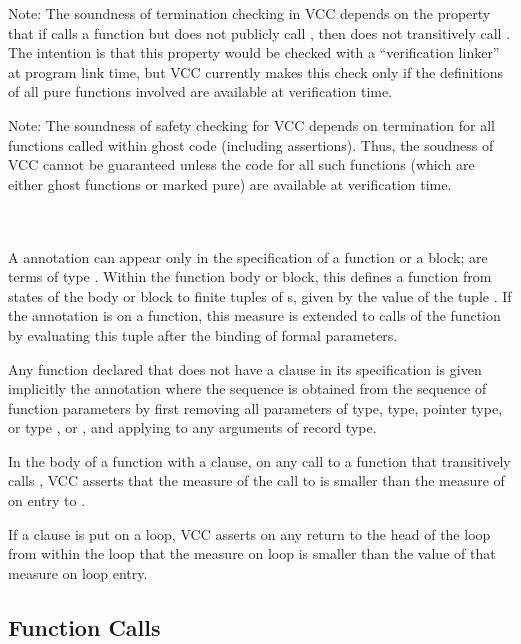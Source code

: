 \documentclass[preprint,nocopyrightspace]{sigplanconf}
\begin{document}
{{{Note: The soundness of termination checking in VCC depends on the
property that if  calls a function  but does not
publicly call , then  does not transitively
call . The intention is that this property would be checked
with a ``verification linker'' at program link time, but VCC currently
makes this check only if the definitions of all pure functions
involved are available at verification time.

Note: The soundness of safety checking for VCC depends on termination
for all functions called within ghost code (including
assertions). Thus, the soudness of VCC cannot be guaranteed unless the
code for all such functions (which are either ghost functions or
marked pure) are available at verification time.

\\
\\
A  annotation can appear only in the specification of a function or
a block;  are terms of type \vcc{\natural}. Within the
function body or block, this defines a function from states of the
body or block to finite tuples of \vcc{\natural}s, given by the value
of the tuple . If the annotation is on a function,
this measure is extended to calls of the function by evaluating this
tuple after the binding of formal parameters. 

Any function declared  that does not have
a  clause in its specification is given implicitly
the annotation  where the
sequence  is obtained from the sequence of function
parameters by first removing all parameters of 
type,  type, pointer type, or type \vcc{\bool}, 
or , and applying  to any arguments of record
type.

In the body of a function  with a  clause, on
any call to a function  that transitively calls ,
VCC asserts that the measure of the call to  is smaller
than the measure of  on entry to . 

If a  clause is put on a loop, VCC asserts on any
return to the head of the loop from within the loop that the measure
on loop is smaller than the value of that measure on loop entry.


\subsection{Function Calls}

}}}
\end{document}
